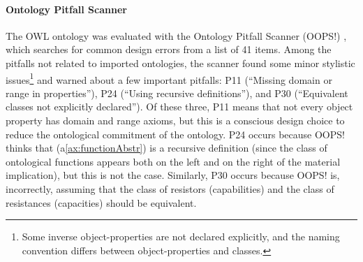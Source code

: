 \documentclass[sw]{iosart2x}
\newcommand{\AxLabel}{\textrm{a}}
\newcommand{\refax}[1]{({\AxLabel}\ref{#1})}
\newcommand{\OWL}{\textnormal{OWL}\xspace}
\newcommand{\qquotes}[1]{``#1''}
\begin{document}
\paragraph{Ontology Pitfall Scanner} The \OWL ontology was evaluated with the Ontology Pitfall Scanner (OOPS!) \cite{poveda2014oops}, which searches for common design errors from a list of 41 items. Among the pitfalls not related to imported ontologies, the scanner found some minor stylistic issues\footnote{Some inverse object-properties are not declared explicitly, and the naming convention differs between object-properties and classes.} and warned about a few important pitfalls: P11 (\qquotes{Missing domain or range in properties}), P24 (\qquotes{Using recursive definitions}), and P30 (\qquotes{Equivalent classes not explicitly declared}). Of these three, P11 means that not every object property has domain and range axioms, but this is a conscious design choice to reduce the ontological commitment of the ontology. P24 occurs because OOPS! thinks that \refax{ax:functionAbstr} is a recursive definition (since the class of ontological functions appears both on the left and on the right of the material implication), but this is not the case. %
Similarly, P30 occurs because OOPS! is, incorrectly, assuming that the class of resistors (capabilities) and the class of resistances (capacities) should be equivalent. %



\end{document}
